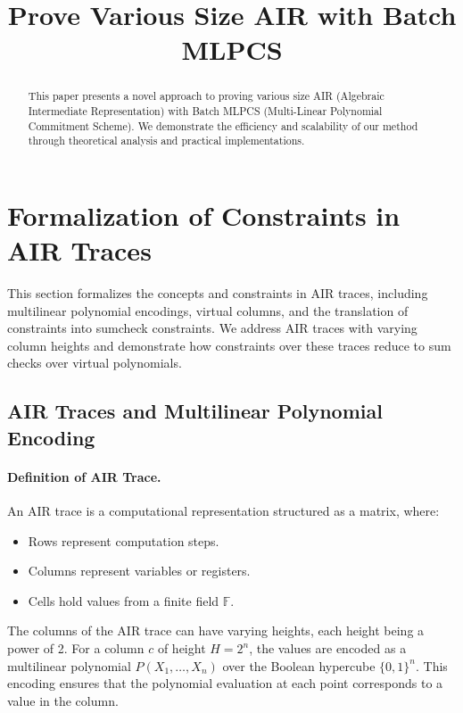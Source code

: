\documentclass{article}
\title{Prove Various Size AIR with Batch MLPCS}
\author{}
\date{}
\begin{document}
\maketitle

\begin{abstract}
This paper presents a novel approach to proving various size AIR (Algebraic Intermediate Representation) with Batch MLPCS (Multi-Linear Polynomial Commitment Scheme). We demonstrate the efficiency and scalability of our method through theoretical analysis and practical implementations.
\end{abstract}

\section{Formalization of Constraints in AIR Traces}

This section formalizes the concepts and constraints in AIR traces, including multilinear polynomial encodings, virtual columns, and the translation of constraints into sumcheck constraints. We address AIR traces with varying column heights and demonstrate how constraints over these traces reduce to sum checks over virtual polynomials.

\subsection{AIR Traces and Multilinear Polynomial Encoding}

\paragraph{Definition of AIR Trace.} An AIR trace is a computational representation structured as a matrix, where:
\begin{itemize}
    \item Rows represent computation steps.
    \item Columns represent variables or registers.
    \item Cells hold values from a finite field \( \mathbb{F} \).
\end{itemize}

The columns of the AIR trace can have varying heights, each height being a power of 2. For a column \( c \) of height \( H = 2^n \), the values are encoded as a multilinear polynomial \( P(X_1, \dots, X_n) \) over the Boolean hypercube \( \{0, 1\}^n \). This encoding ensures that the polynomial evaluation at each point corresponds to a value in the column.
\end{document}
